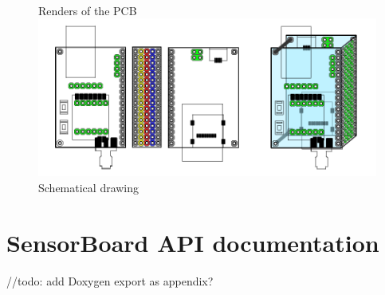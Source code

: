 \begin{figure}
\begin{minipage}[c]{.15\textwidth}
	\end{minipage}
	\vspace{0.5cm}
	\\Renders of the \ac{PCB}\\
	\vspace{1cm}
	\includegraphics[scale=1]{img/SensorBoardDrawing.pdf}
	\\Schematical drawing
\end{figure}

\chapter{SensorBoard API documentation}
//todo: add Doxygen export as appendix?

